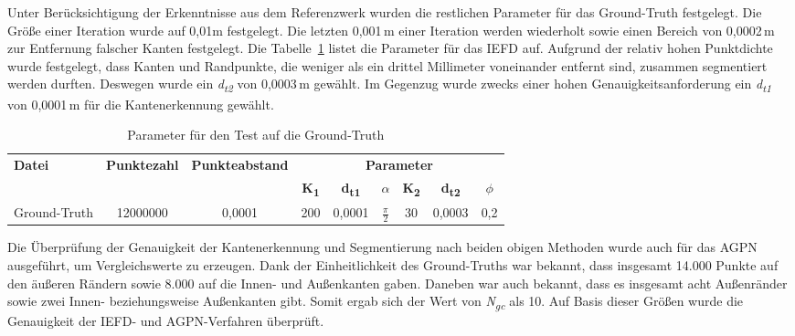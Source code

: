 Unter Berücksichtigung der Erkenntnisse aus dem Referenzwerk wurden die restlichen Parameter für das Ground-Truth festgelegt. Die Größe einer Iteration wurde auf 0,01m festgelegt. Die letzten 0,001\,\si{\m} einer Iteration werden wiederholt sowie einen Bereich von 0,0002\,\si{\m} zur Entfernung falscher Kanten festgelegt. Die Tabelle~\ref{table: parameters_test1} listet die Parameter für das IEFD auf. Aufgrund der relativ hohen Punktdichte wurde festgelegt, dass Kanten und Randpunkte, die weniger als ein drittel Millimeter voneinander entfernt sind, zusammen segmentiert werden durften. Deswegen wurde ein \textit{d\textsubscript{t2}} von 0,0003\,\si{\m} gewählt. Im Gegenzug wurde zwecks einer hohen Genauigkeitsanforderung ein \textit{d\textsubscript{t1}} von 0,0001\,\si{\m} für die Kantenerkennung gewählt.

\begin{table}
	\centering
	\begin{tabular}[width=\textwidth]{l *{8}{c}}
		\hline
		\multirow{2}{*}{\textbf{Datei}}&\multirow{2}{*}{\textbf{Punktezahl}}&\multirow{2}{*}{\textbf{Punkteabstand}}&\multicolumn{6}{c}{\textbf{Parameter}}\\
		& & & \textbf{K\textsubscript{1}} & \textbf{d\textsubscript{t1}} & \textbf{$\alpha$} & \textbf{K\textsubscript{2}} & \textbf{d\textsubscript{t2}} & \textbf{$\phi$} \\
		\hline
		Ground-Truth & 12000000 & 0,0001 & 200 & 0,0001 & $\frac{\pi}{2}$ & 30 & 0,0003 & 0,2 \\
		\hline
	\end{tabular}
	\caption{Parameter für den Test auf die Ground-Truth}
	\label{table: parameters_test1}
\end{table}

Die Überprüfung der Genauigkeit der Kantenerkennung und Segmentierung nach beiden obigen Methoden wurde auch für das AGPN ausgeführt, um Vergleichswerte zu erzeugen. Dank der Einheitlichkeit des Ground-Truths war bekannt, dass insgesamt 14.000 Punkte auf den äußeren Rändern sowie 8.000 auf die Innen- und Außenkanten gaben. Daneben war auch bekannt, dass es insgesamt acht Außenränder sowie zwei Innen- beziehungsweise Außenkanten gibt. Somit ergab sich der Wert von \textit{N\textsubscript{gc}} als 10. Auf Basis dieser Größen wurde die Genauigkeit der IEFD- und AGPN-Verfahren überprüft.

